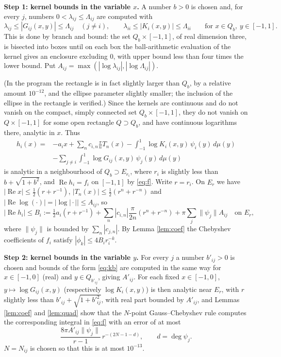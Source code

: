\documentclass[11pt]{amsart}
\theoremstyle{remark}
\newcommand{\re}{\operatorname{Re}}
\begin{document}
\smallskip\noindent\textbf{Step 1: kernel bounds in the variable $x$.}
A number $b>0$ is chosen and, for every $j$, numbers $0<\lambda_{ij}\le\Lambda_{ij}$ are computed with
\begin{equation}\label{eq:kb}
\lambda_{ij}\le|G_{ij}(x,y)|\le\Lambda_{ij}\quad(j\ne i),\qquad\lambda_{ii}\le|K_i(x,y)|\le\Lambda_{ii}\qquad\text{for }x\in Q_b,\ y\in[-1,1].
\end{equation}
This is done by branch and bound: the set $Q_b\times[-1,1]$, of real dimension three, is bisected into boxes until
on each box the ball-arithmetic evaluation of the kernel gives an enclosure excluding $0$, with upper bound less
than four times the lower bound. Put $A_{ij}=\max(|\log\lambda_{ij}|,|\log\Lambda_{ij}|)$.

(In the program the rectangle is in fact slightly larger than $Q_b$, by a relative amount $10^{-12}$, and the
ellipse parameter slightly smaller; the inclusion of the ellipse in the rectangle is verified.)
Since the kernels are continuous and do not vanish on the compact, simply connected set $Q_b\times[-1,1]$, they do
not vanish on $Q\times[-1,1]$ for some open rectangle $Q\supset Q_b$, and have continuous logarithms there,
analytic in $x$. Thus
\begin{align*}
h_i(x)={}&-a_ix+\sum_nc_{i,n}\frac\pi nT_n(x)-\int_{-1}^1\log K_i(x,y)\,\psi_i(y)\,d\mu(y)\\
&-\sum_{j\ne i}\int_{-1}^1\log G_{ij}(x,y)\,\psi_j(y)\,d\mu(y)
\end{align*}
is analytic in a neighbourhood of $Q_b\supset E_{r_i}$, where $r_i$ is slightly less than $b+\sqrt{1+b^2}$, and
$\re h_i=f_i$ on $[-1,1]$ by \eqref{eq:f}. Write $r=r_i$. On $E_r$ we have $|\re x|\le\frac12(r+r^{-1})$,
$|T_n(x)|\le\frac12(r^n+r^{-n})$ and
$|\re\log(\cdot)|=|\log|\cdot||\le A_{ij}$, so
\[
|\re h_i|\le B_i:=\tfrac12a_i(r+r^{-1})+\sum_n|c_{i,n}|\frac\pi{2n}(r^n+r^{-n})+\pi\sum_j\|\psi_j\|A_{ij}
\quad\text{on }E_r,
\]
where $\|\psi_j\|$ is bounded by $\sum_n|c_{j,n}|$. By Lemma \ref{lem:coef} the Chebyshev coefficients of $f_i$
satisfy $|\phi_k|\le4B_ir_i^{-k}$.

\smallskip\noindent\textbf{Step 2: kernel bounds in the variable $y$.}
For every $j$ a number $b'_{ij}>0$ is chosen and bounds of the form \eqref{eq:kb} are computed in the same way for
$x\in[-1,0]$ (real) and $y\in Q_{b'_{ij}}$, giving $A'_{ij}$. For each fixed $x\in[-1,0]$,
$y\mapsto\log G_{ij}(x,y)$ (respectively $\log K_i(x,y)$) is then analytic near $E_{r}$, with $r$ slightly less
than $b'_{ij}+\sqrt{1+b'^2_{ij}}$,
with real part bounded by $A'_{ij}$, and Lemmas \ref{lem:coef} and \ref{lem:quad} show that the $N$-point
Gauss--Chebyshev rule computes the corresponding integral in \eqref{eq:f} with an error of at most
\begin{equation}\label{eq:qerr}
\frac{8\pi A'_{ij}\|\psi_j\|}{r-1}\,r^{-(2N-1-d)},\qquad d=\deg\psi_j .
\end{equation}
$N=N_{ij}$ is chosen so that this is at most $10^{-13}$.
\end{document}
